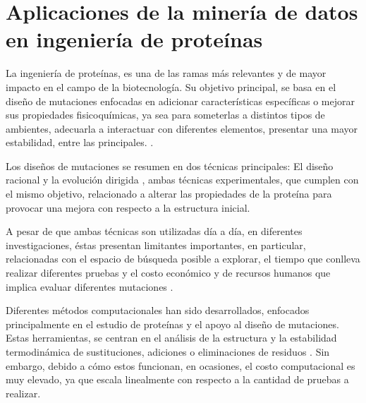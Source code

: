 
\chapter{Aplicaciones de la minería de datos en ingeniería de proteínas}  %

\ifpdf
    \graphicspath{{Chapter1/Figs/Raster/}{Chapter1/Figs/PDF/}{Chapter1/Figs/}}
\else
    \graphicspath{{Chapter1/Figs/Vector/}{Chapter1/Figs/}}
\fi

La ingeniería de proteínas, es una de las ramas más relevantes y de mayor impacto en el campo de la biotecnología. Su objetivo principal, se basa en el diseño de mutaciones enfocadas en adicionar características específicas o mejorar sus propiedades fisicoquímicas, ya sea para someterlas a distintos tipos de ambientes, adecuarla a interactuar con diferentes elementos, presentar una mayor estabilidad, entre las principales. \cite{lutz2009protein}.

Los diseños de mutaciones se resumen en dos técnicas principales: El diseño racional \cite{carpenter1997rational} y la evolución dirigida \cite{arnold1998design}, ambas técnicas experimentales, que cumplen con el mismo objetivo, relacionado a alterar las propiedades de la proteína para provocar una mejora con respecto a la estructura inicial.

A pesar de que ambas técnicas son utilizadas día a día, en diferentes investigaciones, éstas presentan limitantes importantes, en particular, relacionadas con el espacio de búsqueda posible a explorar, el tiempo que conlleva realizar diferentes pruebas y el costo económico y de recursos humanos que implica evaluar diferentes mutaciones \cite{Reetz2008}. 

Diferentes métodos computacionales han sido desarrollados, enfocados principalmente en el estudio de proteínas y el apoyo al diseño de mutaciones. Estas herramientas, se centran en el análisis de la estructura y la estabilidad termodinámica de sustituciones, adiciones o eliminaciones de residuos \cite{Schymkowitz2005, Khan2010, Pandurangan2017, Olivera-Nappa2011}. Sin embargo, debido a cómo estos funcionan, en ocasiones, el costo computacional es muy elevado, ya que escala linealmente con respecto a la cantidad de pruebas a realizar. 

